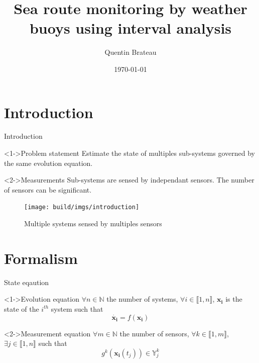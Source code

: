 \documentclass{beamer}
\title{Sea route monitoring by weather buoys using interval analysis}
\date{\today}
\author{Quentin Brateau}
\institute{ENSTA Bretagne}
\begin{document}
    \maketitle

    \section{Introduction}

        \begin{frame}{Introduction}
            \begin{minipage}{0.55\textwidth}
                \begin{block}<1->{Problem statement}
                    Estimate the state of multiples sub-systems governed by the same evolution equation.
                \end{block}
                \begin{block}<2->{Measurements}
                    Sub-systems are sensed by independant sensors. The number of sensors can be significant.
                \end{block}
            \end{minipage}
            \hfill
            \begin{minipage}{0.4\textwidth}
                \begin{figure}
                    \texttt{[image: build/imgs/introduction]}
                    \caption{Multiple systems sensed by multiples sensors}
                \end{figure}
            \end{minipage}
        \end{frame}

    \section{Formalism}

        \begin{frame}{State eqaution}
            \begin{block}<1->{Evolution equation}
                $\forall n \in \mathbb{N}$ the number of systems, $\forall i \in \llbracket 1, n\rrbracket$, $\mathbf{x_i}$ is the state of the $i^{th}$ system such that
                \begin{equation}
                    \dot{\mathbf{x_i}} = f(\mathbf{x_i})
                \end{equation}
            \end{block}

            \begin{block}<2->{Measurement equation}
                $\forall m \in \mathbb{N}$ the number of sensors, $\forall k \in \llbracket 1, m\rrbracket$, $\exists j \in \llbracket 1, n\rrbracket$ such that
                \begin{equation}
                    g^k(\mathbf{x_i}(t_j)) \in \mathbb{Y}_j^k
                \end{equation}
            \end{block}
        \end{frame}
\end{document}
